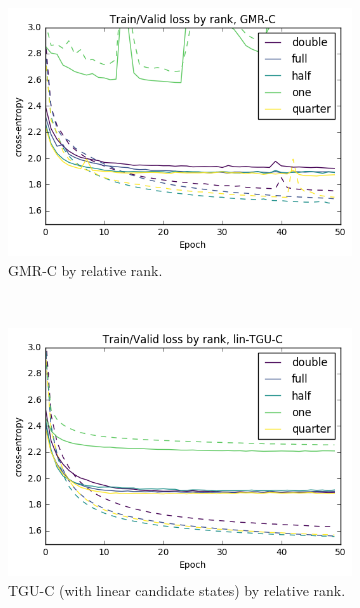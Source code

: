 \begin{figure}
\centering
\begin{subfigure}[t]{0.3\textwidth}
	\centering
	\includegraphics[width=\textwidth]{exps/wp/gmr}
	\caption[War and Peace, GMR]
	{GMR-C by relative rank.}
\end{subfigure}~
\begin{subfigure}[t]{0.3\textwidth}
	\centering
	\includegraphics[width=\textwidth]{exps/wp/lintgu}
	\caption[War and Peace, TGU]
	{TGU-C (with linear candidate states) by relative rank.}
\end{subfigure}~
\begin{subfigure}[t]{0.3\textwidth}
	\centering

\end{subfigure}
\end{figure}
